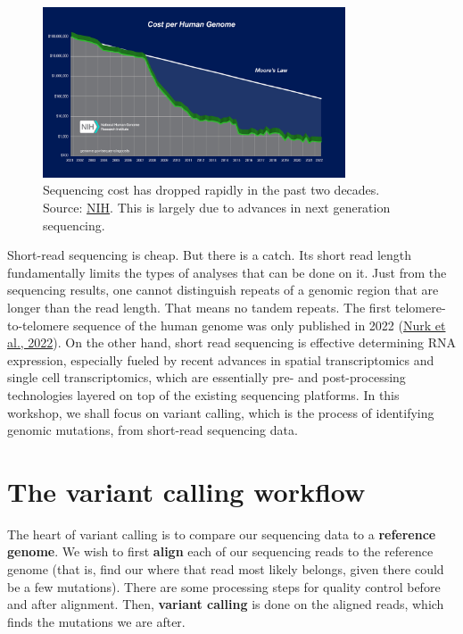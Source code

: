 \documentclass[12pt,letterpaper]{article}
\begin{document}
\begin{figure}
\centering
\includegraphics[width=0.8\textwidth]{genome_sequencing_cost.jpg}
\caption{Sequencing cost has dropped rapidly in the past two decades. Source: \href{https://www.genome.gov/about-genomics/fact-sheets/Sequencing-Human-Genome-cost}{NIH}. This is largely due to advances in next generation sequencing.}
\label{fig:genome-sequencing-cost}
\end{figure}

Short-read sequencing is cheap. But there is a catch. Its short read length fundamentally limits the types of analyses that can be done on it. Just from the sequencing results, one cannot distinguish repeats of a genomic region that are longer than the read length. That means no tandem repeats. The first telomere-to-telomere sequence of the human genome was only published in 2022 (\href{https://www.science.org/doi/10.1126/science.abj6987}{Nurk et al., 2022}). On the other hand, short read sequencing is effective determining RNA expression, especially fueled by recent advances in spatial transcriptomics and single cell transcriptomics, which are essentially pre- and post-processing technologies layered on top of the existing sequencing platforms. In this workshop, we shall focus on variant calling, which is the process of identifying genomic mutations, from short-read sequencing data.

\section{The variant calling workflow}

The heart of variant calling is to compare our sequencing data to a \textbf{reference genome}. We wish to first \textbf{align} each of our sequencing reads to the reference genome (that is, find our where that read most likely belongs, given there could be a few mutations). There are some processing steps for quality control before and after alignment. Then, \textbf{variant calling} is done on the aligned reads, which finds the mutations we are after.
\end{document}
